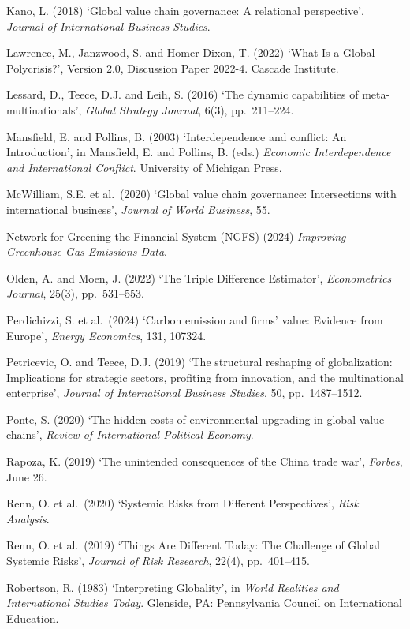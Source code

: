 \documentclass[12pt,a4paper]{article}
\begin{document}
Kano, L. (2018) `Global value chain governance: A relational perspective', \textit{Journal of International Business Studies}.

Lawrence, M., Janzwood, S. and Homer-Dixon, T. (2022) `What Is a Global Polycrisis?', Version 2.0, Discussion Paper 2022-4. Cascade Institute.

Lessard, D., Teece, D.J. and Leih, S. (2016) `The dynamic capabilities of meta-multinationals', \textit{Global Strategy Journal}, 6(3), pp.\ 211--224.

Mansfield, E. and Pollins, B. (2003) `Interdependence and conflict: An Introduction', in Mansfield, E. and Pollins, B. (eds.) \textit{Economic Interdependence and International Conflict}. University of Michigan Press.

McWilliam, S.E. et al.\ (2020) `Global value chain governance: Intersections with international business', \textit{Journal of World Business}, 55.

Network for Greening the Financial System (NGFS) (2024) \textit{Improving Greenhouse Gas Emissions Data}.

Olden, A. and Moen, J. (2022) `The Triple Difference Estimator', \textit{Econometrics Journal}, 25(3), pp.\ 531--553.

Perdichizzi, S. et al.\ (2024) `Carbon emission and firms' value: Evidence from Europe', \textit{Energy Economics}, 131, 107324.

Petricevic, O. and Teece, D.J. (2019) `The structural reshaping of globalization: Implications for strategic sectors, profiting from innovation, and the multinational enterprise', \textit{Journal of International Business Studies}, 50, pp.\ 1487--1512.

Ponte, S. (2020) `The hidden costs of environmental upgrading in global value chains', \textit{Review of International Political Economy}.

Rapoza, K. (2019) `The unintended consequences of the China trade war', \textit{Forbes}, June 26.

Renn, O. et al.\ (2020) `Systemic Risks from Different Perspectives', \textit{Risk Analysis}.

Renn, O. et al.\ (2019) `Things Are Different Today: The Challenge of Global Systemic Risks', \textit{Journal of Risk Research}, 22(4), pp.\ 401--415.

Robertson, R. (1983) `Interpreting Globality', in \textit{World Realities and International Studies Today}. Glenside, PA: Pennsylvania Council on International Education.
\end{document}
